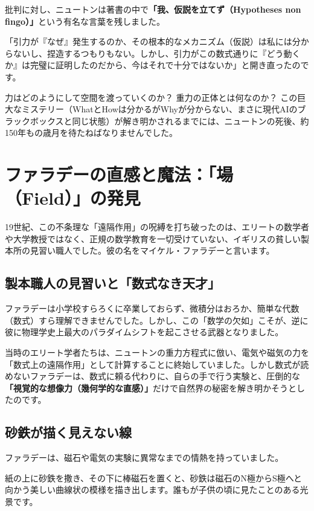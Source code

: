 批判に対し、ニュートンは著書の中で\textbf{「我、仮説を立てず（Hypotheses non fingo）」}という有名な言葉を残しました。

「引力が『なぜ』発生するのか、その根本的なメカニズム（仮説）は私には分からないし、捏造するつもりもない。しかし、引力がこの数式通りに『どう動くか』は完璧に証明したのだから、今はそれで十分ではないか」と開き直ったのです。

力はどのようにして空間を渡っていくのか？ 重力の正体とは何なのか？ この巨大なミステリー（WhatとHowは分かるがWhyが分からない、まさに現代AIのブラックボックスと同じ状態）が解き明かされるまでには、ニュートンの死後、約150年もの歳月を待たねばなりませんでした。

\section{ファラデーの直感と魔法：「場（Field）」の発見}

19世紀、この不条理な「遠隔作用」の呪縛を打ち破ったのは、エリートの数学者や大学教授ではなく、正規の数学教育を一切受けていない、イギリスの貧しい製本所の見習い職人でした。彼の名をマイケル・ファラデーと言います。

\subsection{製本職人の見習いと「数式なき天才」}

ファラデーは小学校すらろくに卒業しておらず、微積分はおろか、簡単な代数（数式）すら理解できませんでした。しかし、この「数学の欠如」こそが、逆に彼に物理学史上最大のパラダイムシフトを起こさせる武器となりました。

当時のエリート学者たちは、ニュートンの重力方程式に倣い、電気や磁気の力を「数式上の遠隔作用」として計算することに終始していました。しかし数式が読めないファラデーは、数式に頼る代わりに、自らの手で行う実験と、圧倒的な\textbf{「視覚的な想像力（幾何学的な直感）」}だけで自然界の秘密を解き明かそうとしたのです。

\subsection{砂鉄が描く見えない線}

ファラデーは、磁石や電気の実験に異常なまでの情熱を持っていました。

紙の上に砂鉄を撒き、その下に棒磁石を置くと、砂鉄は磁石のN極からS極へと向かう美しい曲線状の模様を描き出します。誰もが子供の頃に見たことのある光景です。

